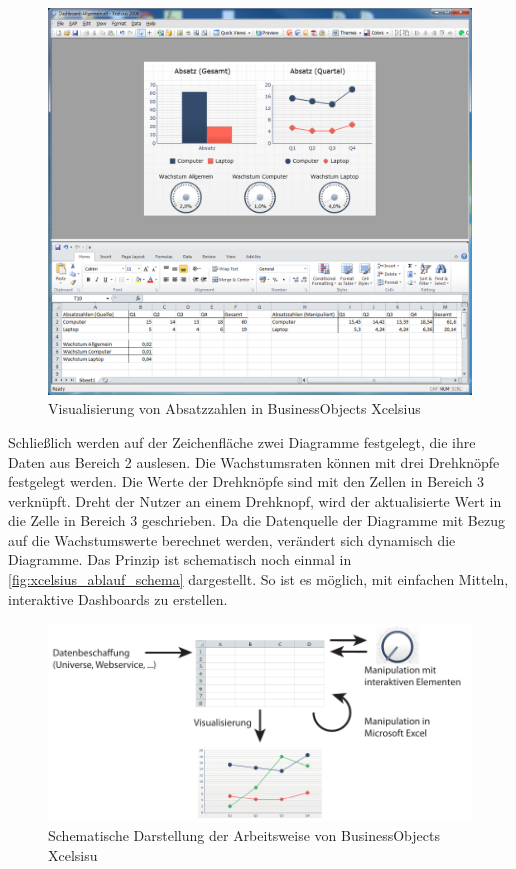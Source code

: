 \begin{onehalfspacing}
\begin{figure}[!ht]
\centering
\setlength{\unitlength}{1mm}
\includegraphics[width=15cm]{images/Abbildung6-Visualisierung-Absatzzahlen.PNG}
\caption{Visualisierung von Absatzzahlen in BusinessObjects Xcelsius\label{fig:xcelsius_ui_beispiel}}
\end{figure} 

Schließlich werden auf der Zeichenfläche zwei Diagramme festgelegt, die ihre Daten aus Bereich 2 auslesen. Die Wachstumsraten können mit drei Drehknöpfe festgelegt werden. Die Werte der Drehknöpfe sind mit den Zellen in Bereich 3 verknüpft. Dreht der Nutzer an einem Drehknopf, wird der aktualisierte Wert in die Zelle in Bereich 3 geschrieben. Da die Datenquelle der Diagramme mit Bezug auf die Wachstumswerte berechnet werden, verändert sich dynamisch die Diagramme. Das Prinzip ist schematisch noch einmal in \vref{fig:xcelsius_ablauf_schema} dargestellt. So ist es möglich, mit einfachen Mitteln, interaktive Dashboards zu erstellen.

\begin{figure}[!ht]
\centering
\setlength{\unitlength}{1mm}
\includegraphics[width=15cm]{images/Abbildung4-Arbeitsweise-Xcelsius.pdf}
\caption{Schematische Darstellung der Arbeitsweise von BusinessObjects Xcelsisu\label{fig:xcelsius_ablauf_schema}}
\end{figure} 


\end{onehalfspacing}
